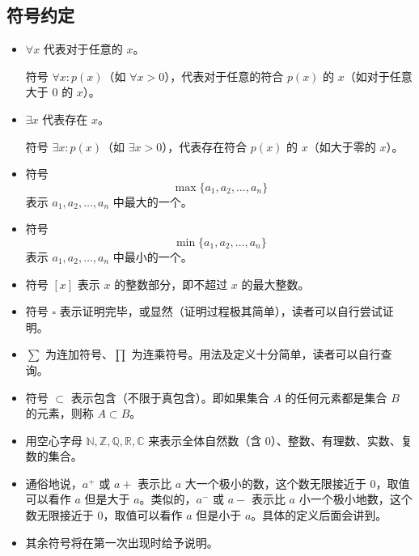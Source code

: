 \documentclass[lang=cn,10pt]{template}
\begin{document}
\subsection{符号约定}
\begin{itemize}
  \item $\forall x$ 代表对于任意的 $x$。
  
  符号 $\forall x: p(x)$（如 $\forall x>0$），代表对于任意的符合 $p(x)$ 的 $x$（如对于任意大于 $0$ 的 $x$）。
  \item $\exists x$ 代表存在 $x$。
  
  符号 $\exists x: p(x)$（如 $\exists x > 0$），代表存在符合 $p(x)$ 的 $x$（如大于零的 $x$）。
  \item 符号
  \begin{equation*}
    \max\{a_1, a_2, \dots, a_n\}
  \end{equation*}
  表示 $a_1, a_2, \dots, a_n$ 中最大的一个。
  \item 符号
  \begin{equation*}
    \min\{a_1, a_2, \dots, a_n\}
  \end{equation*}
  表示 $a_1, a_2, \dots, a_n$ 中最小的一个。
  \item 符号 $[x]$ 表示 $x$ 的整数部分，即不超过 $x$ 的最大整数。
  \item 符号 $\square$ 表示证明完毕，或显然（证明过程极其简单），读者可以自行尝试证明。
  \item $\sum$ 为连加符号、$\prod$ 为连乘符号。用法及定义十分简单，读者可以自行查询。
  \item 符号 $\subset$ 表示包含（不限于真包含）。即如果集合 $A$ 的任何元素都是集合 $B$ 的元素，则称 $A \subset B$。

  \item 用空心字母 $\mathbb{N, Z, Q, R, C}$ 来表示全体自然数（含 $0$）、整数、有理数、实数、复数的集合。

  \item 通俗地说，$a^+$ 或 $a+$ 表示比 $a$ 大一个极小的数，这个数无限接近于 $0$，取值可以看作 $a$ 但是大于 $a$。类似的，$a^-$ 或 $a-$ 表示比 $a$ 小一个极小地数，这个数无限接近于 $0$，取值可以看作 $a$ 但是小于 $a$。具体的定义后面会讲到。

  \item 其余符号将在第一次出现时给予说明。
\end{itemize}
\end{document}
